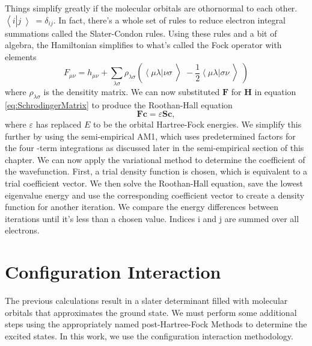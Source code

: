 Things simplify greatly if the molecular orbitals are othornormal to each other. $\left<\right.i\left|\right.j\left>\right. = \delta_{ij}$.
In fact, there's a whole set of rules to reduce electron integral summations called the Slater-Condon rules.\cite{slater1929theory}
Using these rules and a bit of algebra, the Hamiltonian simplifies to what's called the Fock operator with elements
\begin{equation}\label{eq:Fockelement}
  F_{\mu\nu} = h_{\mu\nu}
  + \sum_{\lambda \sigma} \rho_{\lambda \sigma}
  \left(
  \left< \mu \lambda \right| \nu \sigma \left>\right.
  - \frac{1}{2} \left< \mu \lambda \right| \sigma \nu \left>\right.
  \right)
\end{equation}
where \(\rho_{\lambda \sigma}\) is the densitity matrix.
We can now substituted $\mathbf{F}$ for $\mathbf{H}$ in equation \ref{eq:SchrodingerMatrix} to produce the Roothan-Hall equation
\begin{equation}
  \mathbf{Fc}=\varepsilon\mathbf{Sc},
\end{equation}
where $\varepsilon$ has replaced $E$ to be the orbital Hartree-Fock energies.
We simplify this further by using the semi-empirical AM1, which uses predetermined factors for the four -term integrations as discussed later in the semi-empirical section of this chapter.
We can now apply the variational method to determine the coefficient of the wavefunction.
First, a trial density function is chosen, which is equivalent to a trial coefficient vector.
We then solve the Roothan-Hall equation, save the lowest eigenvalue energy and use the corresponding coefficient vector to create a density function for another iteration.
We compare the energy differences between iterations until it's less than a chosen value. 
Indices i and j are summed over all electrons.

\section{Configuration Interaction}\label{CI}
	The previous calculations result in a slater determinant filled with molecular orbitals that approximates the ground state.
	We must perform some additional steps using the appropriately named post-Hartree-Fock Methods to determine the excited states.
	In this work, we use the configuration interaction methodology.

